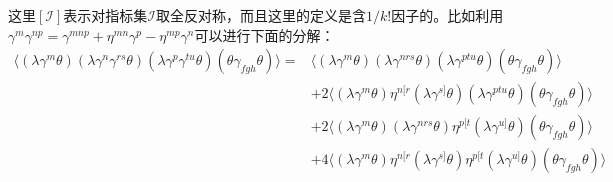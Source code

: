 这里$[\mathcal{I}]$表示对指标集$\mathcal{I}$取全反对称，而且这里的定义是含$1/k!$因子的。比如利用$\gamma^m\gamma^{np}=\gamma^{mnp}+\eta^{mn}\gamma^p-\eta^{mp}\gamma^n$可以进行下面的分解：
\begin{equation}
	\begin{aligned}
		\langle(\lambda\gamma^m\theta)(\lambda\gamma^n\gamma^{rs}\theta)(\lambda\gamma^p\gamma^{tu}\theta)(\theta\gamma_{fgh}\theta)\rangle=&\langle(\lambda\gamma^m\theta)(\lambda\gamma^{nrs}\theta)(\lambda\gamma^{ptu}\theta)(\theta\gamma_{fgh}\theta)\rangle\\&+2\langle(\lambda\gamma^m\theta)\eta^{n[r}(\lambda\gamma^{s]}\theta)(\lambda\gamma^{ptu}\theta)(\theta\gamma_{fgh}\theta)\rangle\\&+2\langle(\lambda\gamma^m\theta)(\lambda\gamma^{nrs}\theta)\eta^{p[t}(\lambda\gamma^{u]}\theta)(\theta\gamma_{fgh}\theta)\rangle\\&+4\langle(\lambda\gamma^m\theta)\eta^{n[r}(\lambda\gamma^{s]}\theta)\eta^{p[t}(\lambda\gamma^{u]}\theta)(\theta\gamma_{fgh}\theta)\rangle
	\end{aligned}
\end{equation}